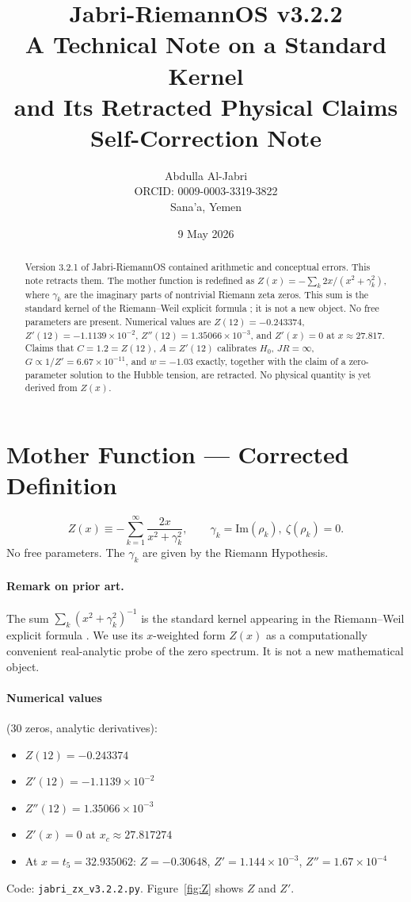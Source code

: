 \documentclass[12pt,a4paper]{article}
\title{\Huge Jabri-RiemannOS v3.2.2 \\[0.3em]
\Large A Technical Note on a Standard Kernel \\ and Its Retracted Physical Claims \\[0.5em]
\large Self-Correction Note}
\author{Abdulla Al-Jabri \\ ORCID: 0009-0003-3319-3822 \\ Sana'a, Yemen}
\date{9 May 2026}
\begin{document}
\maketitle

\begin{abstract}
Version 3.2.1 of Jabri-RiemannOS contained arithmetic and conceptual errors.
This note retracts them. The mother function is redefined as
$Z(x) = -\sum_k 2x/(x^2+\gamma_k^2)$, where $\gamma_k$ are the imaginary
parts of nontrivial Riemann zeta zeros. This sum is the standard kernel of
the Riemann--Weil explicit formula \cite{Weil1952,Edwards1974}; it is not a
new object. No free parameters are present. Numerical values are
$Z(12)=-0.243374$, $Z'(12)=-1.1139\times10^{-2}$, $Z''(12)=1.35066\times10^{-3}$,
and $Z'(x)=0$ at $x\approx27.817$. Claims that $C=1.2=Z(12)$,
$A=Z'(12)$ calibrates $H_0$, $JR=\infty$, $G\propto1/Z'=6.67\times10^{-11}$,
and $w=-1.03$ exactly, together with the claim of a zero-parameter solution
to the Hubble tension, are retracted. No physical quantity is yet derived
from $Z(x)$.
\end{abstract}

\section{Mother Function --- Corrected Definition}
\begin{equation}
Z(x) \equiv -\sum_{k=1}^{\infty} \frac{2x}{x^2+\gamma_k^2},
\qquad \gamma_k = \mathrm{Im}(\rho_k),\ \zeta(\rho_k)=0.
\end{equation}
No free parameters. The $\gamma_k$ are given by the Riemann Hypothesis.

\paragraph{Remark on prior art.}
The sum $\sum_k (x^2+\gamma_k^2)^{-1}$ is the standard kernel appearing in
the Riemann--Weil explicit formula \cite{Weil1952,Edwards1974}. We use its
$x$-weighted form $Z(x)$ as a computationally convenient real-analytic
probe of the zero spectrum. It is not a new mathematical object.

\paragraph{Numerical values} (30 zeros, analytic derivatives):
\begin{itemize}
\item $Z(12) = -0.243374$
\item $Z'(12) = -1.1139\times10^{-2}$
\item $Z''(12) = 1.35066\times10^{-3}$
\item $Z'(x) = 0$ at $x_c \approx 27.817274$
\item At $x = t_5 = 32.935062$: $Z = -0.30648$, $Z' = 1.144\times10^{-3}$,
      $Z'' = 1.67\times10^{-4}$
\end{itemize}
Code: \texttt{jabri\_zx\_v3.2.2.py}. Figure~\ref{fig:Z} shows $Z$ and $Z'$.
\end{document}
